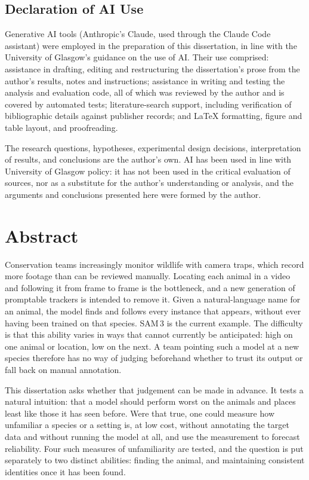 \documentclass[11pt,a4paper]{report}
\begin{document}
\section*{Declaration of AI Use}
Generative AI tools (Anthropic's Claude, used through the Claude Code assistant) were employed in the
preparation of this dissertation, in line with the University of Glasgow's guidance on the use of AI. Their
use comprised: assistance in drafting, editing and restructuring the dissertation's prose from the author's
results, notes and instructions; assistance in writing and testing the analysis and evaluation code, all of
which was reviewed by the author and is covered by automated tests; literature-search support, including
verification of bibliographic details against publisher records; and \LaTeX{} formatting, figure and table
layout, and proofreading.

The research questions, hypotheses, experimental design decisions, interpretation of results, and
conclusions are the author's own. AI has been used in line with University of Glasgow policy: it has not
been used in the critical evaluation of sources, nor as a substitute for the author's understanding or
analysis, and the arguments and conclusions presented here were formed by the author.

\chapter*{Abstract}
Conservation teams increasingly monitor wildlife with camera traps, which record more footage than can be
reviewed manually. Locating each animal in a video and following it from frame to frame is the bottleneck,
and a new generation of promptable trackers is intended to remove it. Given a natural-language name for an
animal, the model finds and follows every instance that appears, without ever having been trained on that
species. SAM\,3 is the current example. The difficulty is that this ability varies in ways that cannot
currently be anticipated: high on one animal or location, low on the next. A team pointing such a model at a
new species therefore has no way of judging beforehand whether to trust its output or fall back on manual
annotation.

This dissertation asks whether that judgement can be made in advance. It tests a natural intuition: that a
model should perform worst on the animals and places least like those it has seen before. Were that true,
one could measure how unfamiliar a species or a setting is, at low cost, without annotating the target data
and without running the model at all, and use the measurement to forecast reliability. Four such measures of
unfamiliarity are tested, and the question is put separately to two distinct abilities: finding the animal,
and maintaining consistent identities once it has been found.
\end{document}
